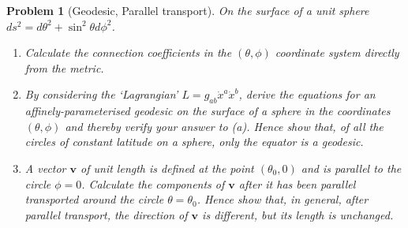 \documentclass[a4paper]{article}
\theoremstyle{new2}
\theoremstyle{new}
\newtheorem{qns}{Problem}[section]
\begin{document}
\newpage
\begin{qns}[Geodesic, Parallel transport]
On the surface of a unit sphere $ds^2 = d\theta^2 + \sin^2\theta d\phi^2$.
\begin{enumerate}[label=(\alph*)]
\item  Calculate the connection coefficients in the $(\theta,\phi)$ coordinate system directly from the metric.
\item By considering the ‘Lagrangian’ $L=g_{ab}\dot{x}^a\dot{x}^b$, derive the equations for an affinely-parameterised geodesic on the surface of a sphere in the coordinates $(\theta, \phi)$ and thereby verify your answer to (a). Hence show that, of all the circles of constant latitude on a sphere, only the equator is a geodesic.
\item A vector $\mathbf{v}$ of unit length is defined at the point $(\theta_0,0)$ and is parallel to the circle $\phi = 0$. Calculate the components of $\mathbf{v}$ after it has been parallel transported around the circle $\theta=\theta_0$. Hence show that, in general, after parallel transport, the direction of $\mathbf{v}$ is different, but its length is unchanged.
\end{enumerate}
\end{qns}
\end{document}

